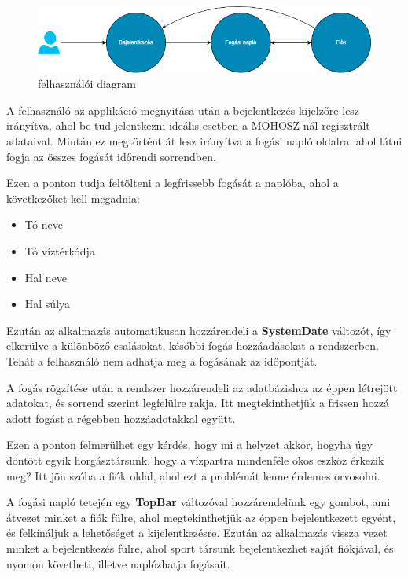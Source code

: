 \begin{figure}[h]
\centering
\includegraphics[scale=0.6]{images/userdiagram.png}
\caption{felhasználói diagram}
\label{fig:userdiagram}
\end{figure}

A felhasználó az applikáció megnyitása után a bejelentkezés kijelzőre lesz irányítva, ahol be tud jelentkezni ideális esetben a MOHOSZ-nál regisztrált adataival. Miután ez megtörtént át lesz irányítva a fogási napló oldalra, ahol látni fogja az összes fogását időrendi sorrendben. 

\vspace{1cm}

Ezen a ponton tudja feltölteni a legfrissebb fogását a naplóba, ahol a következőket kell megadnia:
\begin{itemize}
    \item Tó neve
    \item Tó víztérkódja
    \item Hal neve
    \item Hal súlya
\end{itemize}

Ezután az alkalmazás automatikusan hozzárendeli a \textbf{SystemDate} változót, így elkerülve a különböző csalásokat, későbbi fogás hozzáadásokat a rendszerben. Tehát a felhasználó nem adhatja meg a fogásának az időpontját.

A fogás rögzítése után a rendszer hozzárendeli az adatbázishoz az éppen létrejött adatokat, és sorrend szerint legfelülre rakja. Itt megtekinthetjük a frissen hozzá adott fogást a régebben hozzáadotakkal együtt.

Ezen a ponton felmerülhet egy kérdés, hogy mi a helyzet akkor, hogyha úgy döntött egyik horgásztársunk, hogy a vízpartra mindenféle okos eszköz érkezik meg?
Itt jön szóba a fiók oldal, ahol ezt a problémát lenne érdemes orvosolni.

A fogási napló tetején egy \textbf{TopBar} változóval hozzárendelünk egy gombot, ami átvezet minket a fiók fülre, ahol megtekinthetjük az éppen bejelentkezett egyént, és felkínáljuk a lehetőséget a kijelentkezésre. Ezután az alkalmazás vissza vezet minket a bejelentkezés fülre, ahol sport társunk bejelentkezhet saját fiókjával, és nyomon követheti, illetve naplózhatja fogásait.

